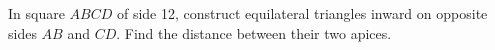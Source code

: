 In square $ABCD$ of side 12, construct equilateral triangles inward on opposite sides $AB$ and $CD$. Find the distance between their two apices.

